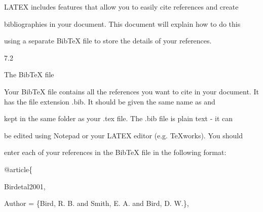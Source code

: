 \documentclass[a4paper,portrait,12pt]{article}
\begin{document}
\begin{flushleft}
LATEX includes features that allow you to easily cite references and create
\end{flushleft}


\begin{flushleft}
bibliographies in your document. This document will explain how to do this
\end{flushleft}


\begin{flushleft}
using a separate BibTeX file to store the details of your references.
\end{flushleft}





7.2





\begin{flushleft}
The BibTeX file
\end{flushleft}





\begin{flushleft}
Your BibTeX file contains all the references you want to cite in your document. It has the file extension .bib. It should be given the same name as and
\end{flushleft}


\begin{flushleft}
kept in the same folder as your .tex file. The .bib file is plain text - it can
\end{flushleft}


\begin{flushleft}
be edited using Notepad or your LATEX editor (e.g. TeXworks). You should
\end{flushleft}


\begin{flushleft}
enter each of your references in the BibTeX file in the following format:
\end{flushleft}





\begin{flushleft}
@article\{
\end{flushleft}


\begin{flushleft}
Birdetal2001,
\end{flushleft}


\begin{flushleft}
Author = \{Bird, R. B. and Smith, E. A. and Bird, D. W.\},
\end{flushleft}
\end{document}
